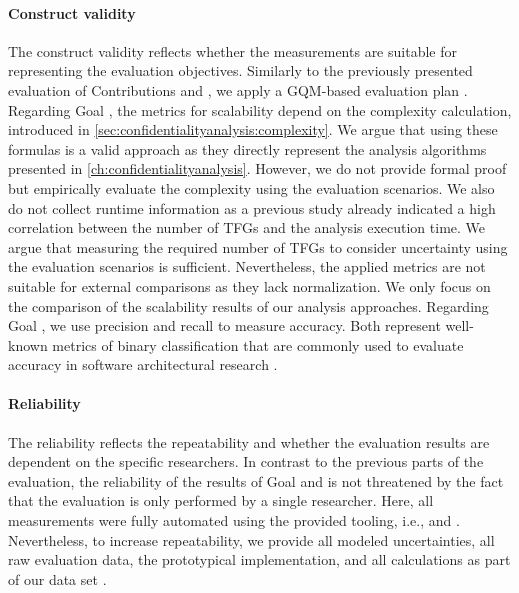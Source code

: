 \paragraph*{Construct validity}
The construct validity reflects whether the measurements are suitable for representing the evaluation objectives.
Similarly to the previously presented evaluation of Contributions  and , we apply a \ac{GQM}-based evaluation plan \cite{basili_methodology_1984,basili_goal_1994}.
Regarding Goal , the metrics for scalability depend on the complexity calculation, introduced in \autoref{sec:confidentialityanalysis:complexity}.
We argue that using these formulas is a valid approach as they directly represent the analysis algorithms presented in \autoref{ch:confidentialityanalysis}.
However, we do not provide formal proof but empirically evaluate the complexity using the evaluation scenarios.
We also do not collect runtime information as a previous study already indicated a high correlation between the number of \acp{TFG} and the analysis execution time.
We argue that measuring the required number of \acp{TFG} to consider uncertainty using the evaluation scenarios is sufficient.
Nevertheless, the applied metrics are not suitable for external comparisons as they lack normalization.
We only focus on the comparison of the scalability results of our analysis approaches.
Regarding Goal , we use precision and recall to measure accuracy.
Both represent well-known metrics of binary classification \cite{powers_evaluation_2011,van_rijsbergen_information_1979} that are commonly used to evaluate accuracy in software architectural research \cite{konersmann_evaluation_2022}.


\paragraph*{Reliability}
The reliability reflects the repeatability and whether the evaluation results are dependent on the specific researchers.
In contrast to the previous parts of the evaluation, the reliability of the results of Goal  and  is not threatened by the fact that the evaluation is only performed by a single researcher.
Here, all measurements were fully automated using the provided tooling, i.e., \uia and \abunai.
Nevertheless, to increase repeatability, we provide all modeled uncertainties, all raw evaluation data, the prototypical implementation, and all calculations as part of our data set \cite{dataset}.






